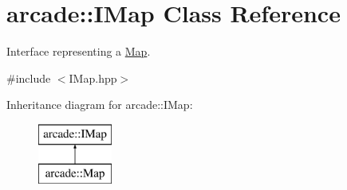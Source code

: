 \hypertarget{classarcade_1_1_i_map}{\section{arcade\-:\-:I\-Map Class Reference}
\label{classarcade_1_1_i_map}
}


Interface representing a \hyperlink{classarcade_1_1_map}{Map}.  




{\ttfamily \#include $<$I\-Map.\-hpp$>$}

Inheritance diagram for arcade\-:\-:I\-Map\-:\begin{figure}[H]
\begin{center}
\leavevmode
\includegraphics[height=2.000000cm]{classarcade_1_1_i_map}
\end{center}
\end{figure}

